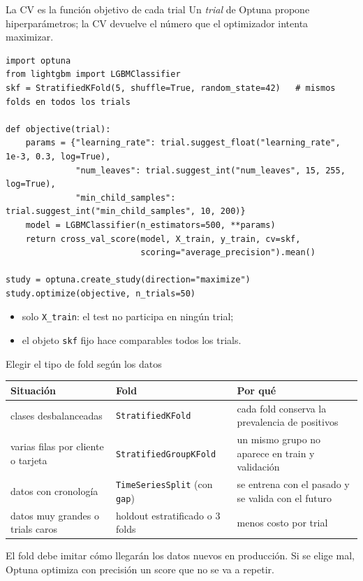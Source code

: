 \documentclass[aspectratio=169,12pt]{beamer}
\newcommand{\hrow}{\rowcolor{mlcream}}
\begin{document}
\begin{frame}[fragile]{La CV es la función objetivo de cada trial}
  \small Un \emph{trial} de Optuna propone hiperparámetros; la CV devuelve el número que el optimizador intenta maximizar.
\begin{lstlisting}[basicstyle=\ttfamily\scriptsize,columns=fullflexible,keepspaces=true,xleftmargin=12pt]
import optuna
from lightgbm import LGBMClassifier
skf = StratifiedKFold(5, shuffle=True, random_state=42)   # mismos folds en todos los trials

def objective(trial):
    params = {"learning_rate": trial.suggest_float("learning_rate", 1e-3, 0.3, log=True),
              "num_leaves": trial.suggest_int("num_leaves", 15, 255, log=True),
              "min_child_samples": trial.suggest_int("min_child_samples", 10, 200)}
    model = LGBMClassifier(n_estimators=500, **params)
    return cross_val_score(model, X_train, y_train, cv=skf,
                           scoring="average_precision").mean()

study = optuna.create_study(direction="maximize")
study.optimize(objective, n_trials=50)
\end{lstlisting}
  \begin{itemize}
    \item solo \texttt{X\_train}: el test no participa en ningún trial;
    \item el objeto \texttt{skf} fijo hace comparables todos los trials.
  \end{itemize}
\end{frame}

\begin{frame}{Elegir el tipo de fold según los datos}
  \centering\footnotesize
  \begin{tabular}{@{}L{0.3\textwidth} L{0.27\textwidth} L{0.33\textwidth}@{}}
    \toprule
    \hrow \textbf{Situación} & \textbf{Fold} & \textbf{Por qué} \\
    \midrule
    clases desbalanceadas & \texttt{StratifiedKFold} & cada fold conserva la prevalencia de positivos \\
    varias filas por cliente o tarjeta & \texttt{StratifiedGroupKFold} & un mismo grupo no aparece en train y validación \\
    datos con cronología & \texttt{TimeSeriesSplit} (con \texttt{gap}) & se entrena con el pasado y se valida con el futuro \\
    datos muy grandes o trials caros & holdout estratificado o 3 folds & menos costo por trial \\
    \bottomrule
  \end{tabular}
  \raggedright
  \begin{keybox}[Criterio]
    \small El fold debe imitar cómo llegarán los datos nuevos en producción. Si se elige mal, Optuna optimiza con precisión un score que no se va a repetir.
  \end{keybox}
\end{frame}
\end{document}
